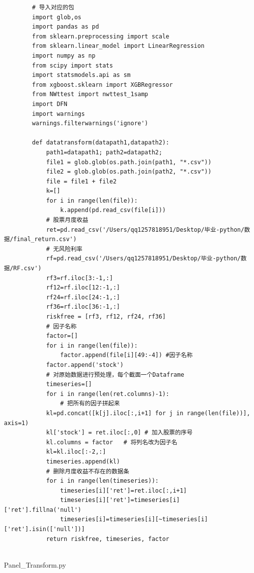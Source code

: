 \documentclass[12pt]{article} %
\begin{document}
	\begin{lstlisting}
		# 导入对应的包
		import glob,os
		import pandas as pd
		from sklearn.preprocessing import scale
		from sklearn.linear_model import LinearRegression
		import numpy as np
		from scipy import stats
		import statsmodels.api as sm
		from xgboost.sklearn import XGBRegressor
		from NWttest import nwttest_1samp
		import DFN
		import warnings
		warnings.filterwarnings('ignore')
		
		def datatransform(datapath1,datapath2):
			path1=datapath1; path2=datapath2;
			file1 = glob.glob(os.path.join(path1, "*.csv"))
			file2 = glob.glob(os.path.join(path2, "*.csv"))
			file = file1 + file2
			k=[]
			for i in range(len(file)):
				k.append(pd.read_csv(file[i]))
			# 股票月度收益
			ret=pd.read_csv('/Users/qq1257818951/Desktop/毕业-python/数据/final_return.csv')
			# 无风险利率
			rf=pd.read_csv('/Users/qq1257818951/Desktop/毕业-python/数据/RF.csv')
			rf3=rf.iloc[3:-1,:]
			rf12=rf.iloc[12:-1,:]
			rf24=rf.iloc[24:-1,:]
			rf36=rf.iloc[36:-1,:]
			riskfree = [rf3, rf12, rf24, rf36]
			# 因子名称
			factor=[]
			for i in range(len(file)):
				factor.append(file[i][49:-4]) #因子名称
			factor.append('stock')
			# 对原始数据进行预处理，每个截面一个Dataframe
			timeseries=[]
			for i in range(len(ret.columns)-1):
				# 把所有的因子拼起来
			kl=pd.concat([k[j].iloc[:,i+1] for j in range(len(file))], axis=1) 
			kl['stock'] = ret.iloc[:,0] # 加入股票的序号
			kl.columns = factor   # 将列名改为因子名
			kl=kl.iloc[:-2,:]     
			timeseries.append(kl)
			# 删除月度收益不存在的数据条
			for i in range(len(timeseries)):
				timeseries[i]['ret']=ret.iloc[:,i+1]
				timeseries[i]['ret']=timeseries[i]['ret'].fillna('null')
				timeseries[i]=timeseries[i][~timeseries[i]['ret'].isin(['null'])]
			return riskfree, timeseries, factor
	\end{lstlisting}
	~\\
	Panel\_Transform.py
\end{document}
